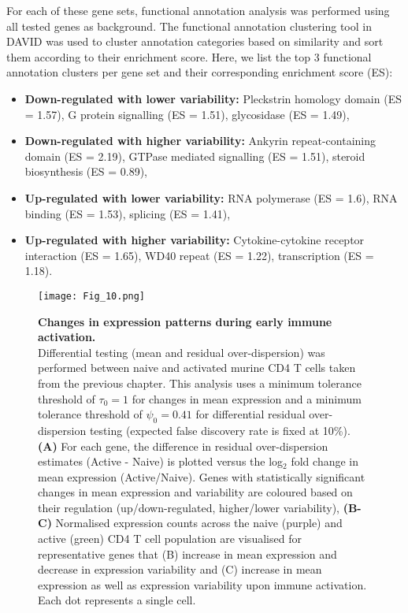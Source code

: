 For each of these gene sets, functional annotation analysis was performed using all tested genes as background. The functional annotation clustering tool in DAVID \citep{Dennis2003} was used to cluster annotation categories based on similarity and sort them according to their enrichment score. Here, we list the top 3 functional annotation clusters per gene set and their corresponding enrichment score (ES):
\begin{itemize}
\item \textbf{Down-regulated with lower variability:} Pleckstrin homology domain (ES = 1.57), G protein signalling (ES = 1.51), glycosidase (ES = 1.49),
\item \textbf{Down-regulated with higher variability:} Ankyrin repeat-containing domain (ES = 2.19), GTPase mediated signalling (ES = 1.51), steroid biosynthesis (ES = 0.89), 
\item \textbf{Up-regulated with lower variability:} RNA polymerase (ES = 1.6), RNA binding (ES = 1.53), splicing (ES = 1.41),
\item \textbf{Up-regulated with higher variability:} Cytokine-cytokine receptor interaction (ES = 1.65), WD40 repeat (ES = 1.22), transcription (ES = 1.18).
\end{itemize}

\newpage


\begin{figure}[!h]
\centering
\texttt{[image: Fig\_10.png]}
\caption[Changes in expression patterns during early immune activation]{\textbf{Changes in expression patterns during early immune activation.}\\
Differential testing (mean and residual over-dispersion) was performed between naive and activated murine CD4\plus{} T cells taken from the previous chapter. This analysis uses a minimum tolerance threshold of $\tau_0=1$ for changes in mean expression and a minimum tolerance threshold of $\psi_0=0.41$ for differential residual over-dispersion testing (expected false discovery rate is fixed at 10\%). \textbf{(A)} For each gene, the difference in residual over-dispersion estimates (Active - Naive) is plotted versus the log$_2$ fold change in mean expression (Active/Naive). Genes with statistically significant changes in mean expression and variability are coloured based on their regulation (up/down-regulated, higher/lower variability), \textbf{(B-C)} Normalised expression counts across the naive (purple) and active (green) CD4\plus{} T cell population are visualised for representative genes that (B) increase in mean expression and decrease in expression variability and (C) increase in mean expression as well as expression variability  upon immune activation. Each dot represents a single cell.}
\label{fig2:immune_activation}
\end{figure}

